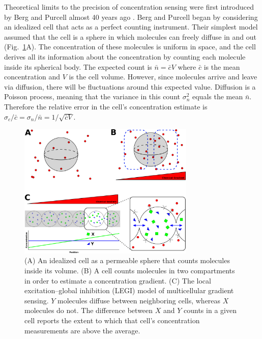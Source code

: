 Theoretical limits to the precision of concentration sensing were first introduced by Berg and Purcell almost 40 years ago \cite{berg1977physics}. Berg and Purcell began by considering an idealized cell that acts as a perfect counting instrument. Their simplest model assumed that the cell is a sphere in which molecules can freely diffuse in and out (Fig.\ \ref{sensing}A). The concentration of these molecules is uniform in space, and the cell derives all its information about the concentration by counting each molecule inside its spherical body. The expected count is
$\bar{n} = \bar{c}V$ where $\bar{c}$ is the mean concentration and $V$ is the cell volume.
However, since molecules arrive and leave via diffusion, there will be fluctuations around this expected value. Diffusion is a Poisson process, meaning that the variance in this count $\sigma_n^2$ equals the mean $\bar{n}$. Therefore the relative error in the cell's concentration estimate is
$\sigma_c/\bar{c} = \sigma_n/\bar{n} = 1/\sqrt{\bar{c} V}$.



\begin{figure}[tb]
    \centering
        \includegraphics[width=0.75\textwidth]{../fig/ch1_fig2.pdf}
    \caption{
    (A) An idealized cell as a permeable sphere that counts molecules inside its volume.
    (B) A cell counts molecules in two compartments in order to estimate a concentration gradient.
    (C) The local excitation--global inhibition (LEGI) model of multicellular gradient sensing. $Y$ molecules diffuse between neighboring cells, whereas $X$ molecules do not. The difference between $X$ and $Y$ counts in a given cell reports the extent to which that cell's concentration measurements are above the average.}
    \label{sensing}
\end{figure}



